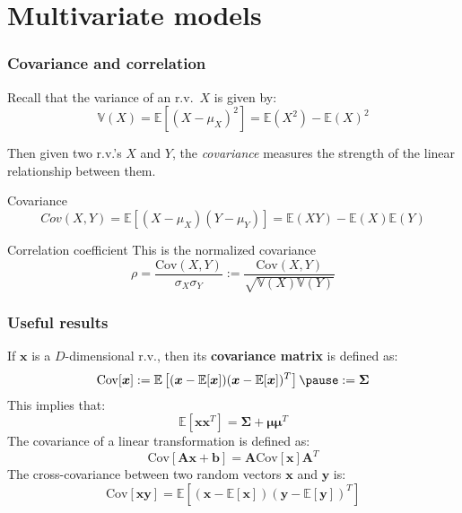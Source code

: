 \documentclass[usenames,dvipsnames,smaller%
]{beamer}
\newcommand{\lt}{\left}
\newcommand{\rt}{\right}
\newcommand{\?}{\stackrel{?}{=}}
\newcommand{\fr}{\frac}
\begin{document}
\section{Multivariate models}

\begin{frame}
  \frametitle{Covariance and correlation}
  Recall that the variance of an r.v.\ $X$ is given by:
  \begin{equation}
    \label{eq:52}
    \mathbb{V}(X) = \mathbb{E}[(X-\mu_X)^2 ] = \mathbb{E}(X^2) - \mathbb{E}(X)^2
  \end{equation}

  Then given two r.v.'s $X$ and $Y$, the {\it covariance} measures the strength of the linear relationship between them.
  \pause
  
  \begin{block}{Covariance}
    \begin{equation}
      \label{eq:50}
      Cov(X,Y) = \mathbb{E}[(X-\mu_X)(Y-\mu_Y)] = \mathbb{E}(XY) - \mathbb{E}(X)\mathbb{E}(Y)
    \end{equation}    
  \end{block}

\pause

  \begin{block}{Correlation coefficient}
    This is the normalized covariance
    \begin{equation}
    \label{eq:51}
    \rho = \fr{\mathrm{Cov}(X,Y)}{\sigma_X\sigma_Y} := \fr{\mathrm{Cov}(X,Y)}{\sqrt{\mathbb{V}(X)\mathbb{V}(Y)}}
  \end{equation}
  \end{block}
    
\end{frame}


\begin{frame}
  \frametitle{Useful results}
  \pause
  If $\bm x$ is a $D$-dimensional r.v., then its \textbf{covariance matrix} is defined as:\pause
  \begin{equation}
    \mathrm{Cov}[{\bm x}] :=  \mathbb{E}\lt[(\bm x-\mathbb{E}[{\bm x}])(\bm x-\mathbb{E}[{\bm x}])^{T}\rt] \pause := \bm \Sigma
  \end{equation}
  \pause
  This implies that:
  \begin{equation}
    \mathbb{E}[\bm{xx}^{T}] = {\bm \Sigma} + {\bm \mu \bm\mu}^{T}
  \end{equation}
  \pause
  The covariance of a linear transformation is defined as: \pause
  \begin{equation}
    \mathrm{Cov}[\bm A\bm x + \bm b] = \bm A\mathrm{Cov}[\bm x]\bm A^{T}
  \end{equation}
  \pause
  The cross-covariance between two random vectors $\bm x$ and $\bm y$ is: \pause
  \begin{equation}
    \mathrm{Cov}[{\bm x}\bm y] = \mathbb{E}\lt[(\bm x - \mathbb{E}[\bm x])(\bm y - \mathbb{E}[\bm y])^{T}\rt]
  \end{equation}
\end{frame}
\end{document}

